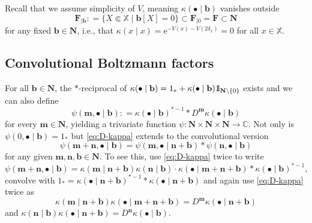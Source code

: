 \documentclass[10pt,a4paper]{amsart}
\newcommand{\e}{\mathrm{e}}
\newcommand{\C}{\mathbb{C}}
\newcommand{\X}{\mathbb X}
\newcommand{\be}{\begin{equation}}
\newcommand{\ee}{\end{equation}}
\def\1{{\mathchoice {1\mskip-4mu\mathrm l}      
{1\mskip-4mu\mathrm l}
{1\mskip-4.5mu\mathrm l} {1\mskip-5mu\mathrm l}}}
\begin{document}
Recall that we assume simplicity of $V$, meaning $\kappa(\bullet \mid \mathbf b)$ vanishes outside
\[
	\mathbf F_{\mid \mathbf b} : = \{X \Subset \X \mid \mathbf b[X] = 0\} \subset \mathbf F_{\mid 0} = \mathbf F \subset \mathbf N
\]
for any fixed $\mathbf b \in \mathbf N$, i.e., that $\kappa(x \mid x) = \e^{-V(x) - V(2 \delta_x)} = 0$ for all $x \in \X$.

\subsection{Convolutional Boltzmann factors}

For all $\mathbf b \in \mathbf N$, the $\ast$-reciprocal of $\kappa(\bullet \mid \mathbf b) = 1_\ast + \kappa(\bullet \mid \mathbf b) \1_{\mathbf N \setminus \{0\}}$ exists and we can also define
\[
	\psi(\mathbf m, \bullet \mid \mathbf b) : = \kappa(\bullet \mid \mathbf b)^{\ast -1} \ast D^\mathbf m \kappa(\bullet \mid \mathbf b)
\]
for every $\mathbf m \in \mathbf N$, yielding a trivariate function $\psi : \mathbf N \times \mathbf N \times \mathbf N \to \C$. 
Not only is $\psi(0, \bullet \mid \mathbf b) = 1_\ast$ but \eqref{eq:D-kappa} extends to the convolutional version
\be \label{eq:psi-conditional-convolution}
	\psi(\mathbf m + \mathbf n, \bullet \mid \mathbf b) = \psi(\mathbf m, \bullet \mid \mathbf n + \mathbf b) \ast \psi(\mathbf n, \bullet \mid \mathbf b)
\ee
for any given $\mathbf m, \mathbf n, \mathbf b \in \mathbf N$. 
To see this, use \eqref{eq:D-kappa} twice to write
\[
	\psi(\mathbf m + \mathbf n, \bullet \mid \mathbf b) = \kappa(\mathbf m \mid \mathbf n + \mathbf b) \kappa(\mathbf n \mid \mathbf b) \cdot \kappa(\bullet \mid \mathbf m + \mathbf n + \mathbf b) \ast \kappa(\bullet \mid \mathbf b)^{\ast -1},
\]
convolve with $1_\ast = \kappa(\bullet \mid \mathbf n + \mathbf b)^{\ast -1} \ast \kappa(\bullet \mid \mathbf n + \mathbf b)$ and again use \eqref{eq:D-kappa} twice as
\[
	\kappa(\mathbf m \mid \mathbf n + \mathbf b) \kappa(\bullet \mid \mathbf m + \mathbf n + \mathbf b) = D^\mathbf m \kappa(\bullet \mid \mathbf n + \mathbf b)
\]
and $\kappa(\mathbf n \mid \mathbf b) \kappa(\bullet \mid \mathbf n + \mathbf b) = D^\mathbf n \kappa(\bullet \mid \mathbf b)$.
\end{document}
